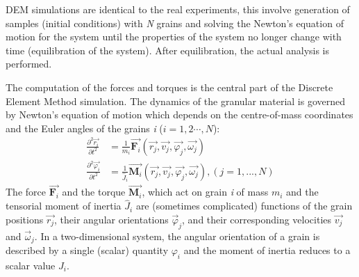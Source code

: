 DEM simulations are identical to the real experiments, this involve generation 
of samples (initial conditions) with \textit{N} grains and solving the Newton's 
equation of motion for the system until the properties of the system no longer 
change with time (equilibration of the system). After equilibration, the actual 
analysis is performed.

The computation of the forces and torques is the central part of the Discrete 
Element Method simulation. The dynamics of the granular material is governed by 
Newton's equation of motion which depends on the centre-of-mass coordinates and 
the Euler angles of the grains \textit{i} ($i = 1, 2 \cdots , N$):
%
\begin{align} 
\frac{{{\partial}^2}{\overrightarrow{r_i}}}{\partial{t^2}} 
&=\frac{1}{m_i}\overrightarrow{{\mathbf{F}}_{i}}(\overrightarrow{r_j},\overrightarrow{v_j},
 \overrightarrow{\varphi_j},\overrightarrow{\omega_j}) \\ 
\frac{{\partial^2}{\overrightarrow{\varphi_i}}}{\partial{t^2}}&
=\frac{1}{{\hat{J}}_i}\overrightarrow{\mathbf{M}_i}
(\overrightarrow{r_j},\overrightarrow{v_j},\overrightarrow{\varphi_j},
   \overrightarrow{\omega_j}), (j=1,...,N) 
\end{align}
%
The force $\overrightarrow{\mathbf{F}_{i}}$ and the torque 
$\overrightarrow{\mathbf{M}_{i}}$, which act on grain \textit{i} of mass 
$\mathit{m}_{\mathit{i}}$ and the tensorial moment of inertia 
${\hat{J}_i}$ are (sometimes complicated) functions of the grain 
positions $\overrightarrow{\mathit{r}_{\mathit{j}}}$, their angular 
orientations $\overrightarrow{\varphi}_{\mathit{j}}$, and their corresponding 
velocities $\overrightarrow{\mathit{v}_{\mathit{j}}}$ and 
$\overrightarrow{\omega}_{\mathit{j}}$. In a two-dimensional system, the 
angular orientation of a grain is described by a single (scalar) quantity 
$\varphi_{i}$ and the moment of inertia reduces to a scalar value 
$\mathit{J}_{i}$. 
%	
%	

